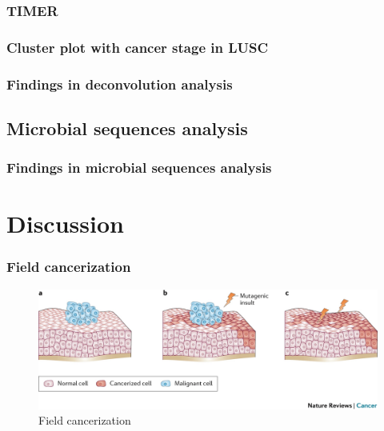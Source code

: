 \documentclass{beamer}
\begin{document}
            \subsubsection{TIMER}
                \begin{frame}
                    \frametitle{Cluster plot with cancer stage in LUSC}
                \end{frame}

            \begin{frame}
                \frametitle{Findings in deconvolution analysis}
            \end{frame}

        \subsection{Microbial sequences analysis}
            \begin{frame}
                \frametitle{Findings in microbial sequences analysis}
            \end{frame}

    \section{Discussion}
        \begin{frame}
            \frametitle{Field cancerization}

            \begin{figure}
                \includegraphics[width=0.9 \linewidth]{figures/LungCancer/cancerization.jpg}
                \caption{Field cancerization \protect\cite{cancerization-01}}
            \end{figure}
        \end{frame}
\end{document}
